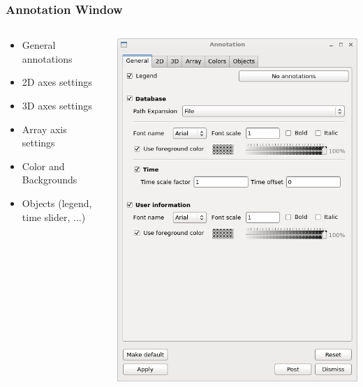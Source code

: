 \begin{frame}
\frametitle{Annotation Window}
\begin{columns}
\begin{column}{5cm}
\begin{itemize}
        \item General annotations
        \item 2D axes settings
        \item 3D axes settings
        \item Array axis settings
	\item Color and Backgrounds
	\item Objects (legend, time slider, ...)
\end{itemize}
\end{column}
\begin{column}{5cm}
        \includegraphics[width=\columnwidth]{figs/visit-guis/visit_annot}
\end{column}
\end{columns}
\end{frame}


